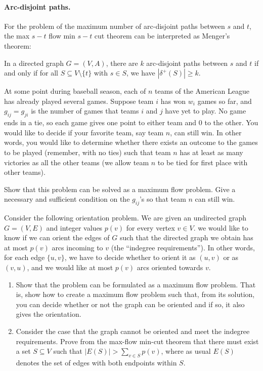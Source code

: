 \documentclass[12pt]{article}
\begin{document}
\paragraph{Arc-disjoint paths.} For the problem of the maximum number
of arc-disjoint paths between $s$ and $t$, the max $s-t$ flow min
$s-t$ cut theorem can be interpreted as Menger's theorem:

\begin{theorem}   
In a directed graph $G=(V,A)$, there are $k$ arc-disjoint paths
between $s$ and $t$ if and only if for all $S\subseteq V\setminus
\{t\}$ with $s\in S$, we have $|\delta^+(S)|\geq k$. 
\end{theorem}

\begin{exercises}
\item
At some point during baseball season, each of $n$ teams of the
American League has already played several games. Suppose team $i$ has
won $w_i$ games so far, and $g_{ij}=g_{ji}$ is the number of games
that teams $i$ and $j$ have yet to play. No game ends in a tie, so
each game gives one point to either team and 0 to the other. You would
like to decide if your favorite team, say team $n$, can
still win. In other words, you would like to determine whether there
exists an outcome to the games to be played (remember, with no ties)
such that team $n$ has at least as many victories as all the other
teams (we allow team $n$ to be tied for first place with other teams).

Show that this problem can be solved as a maximum flow problem. Give a necessary and sufficient condition on the $g_{ij}$'s so that team $n$ can still win. 

\item
Consider the following orientation problem. We
  are given an undirected graph $G=(V,E)$ and integer values $p(v)$
  for every vertex $v\in V$. we would like to know if we can orient
  the edges of $G$ such that the directed graph we obtain has at most
  $p(v)$ arcs incoming to $v$ (the ``indegree requirements''). In
  other words, for each edge $\{u,v\}$, we have to decide whether to
  orient it as $(u,v)$ or as $(v,u)$, and we would like at most $p(v)$
  arcs oriented towards $v$.
\begin{enumerate}
\item
Show that the problem can be formulated as a maximum flow
problem. That is, show how to create a maximum flow problem such that,
from its solution, you can decide whether or not the graph can be
oriented and if so, it also gives the orientation. 
\item
Consider the case that the graph cannot be oriented and meet the
indegree requirements. Prove from the max-flow min-cut theorem that
there must exist a set $S\subseteq V$ such that $|E(S)| > \sum_{v\in
  S} p(v)$, where as usual $E(S)$ denotes the set of edges with both
endpoints within $S$.
\end{enumerate} 

\end{exercises}
\end{document}
